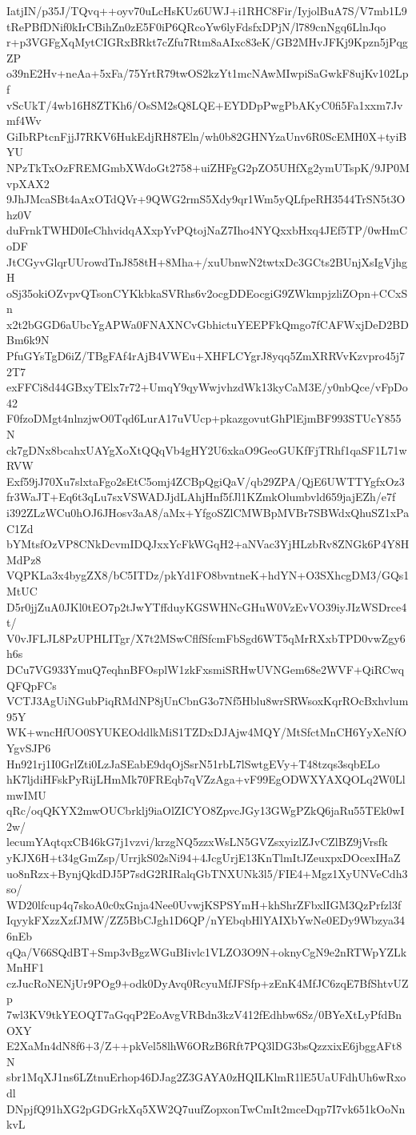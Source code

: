 IatjIN/p35J/TQvq++oyv70uLcHsKUz6UWJ+i1RHC8Fir/IyjolBuA7S/V7mb1L9
tRePBfDNif0kIrCBihZn0zE5F0iP6QRcoYw6lyFdsfxDPjN/l789cnNgq6LlnJqo
r+p3VGFgXqMytCIGRxBRkt7cZfu7Rtm8aAIxc83eK/GB2MHvJFKj9Kpzn5jPqgZP
o39nE2Hv+neAa+5xFa/75YrtR79twOS2kzYt1mcNAwMIwpiSaGwkF8ujKv102Lpf
vScUkT/4wb16H8ZTKh6/OsSM2sQ8LQE+EYDDpPwgPbAKyC0fi5Fa1xxm7Jvmf4Wv
GiIbRPtcnFjjJ7RKV6HukEdjRH87Eln/wh0b82GHNYzaUnv6R0ScEMH0X+tyiBYU
NPzTkTxOzFREMGmbXWdoGt2758+uiZHFgG2pZO5UHfXg2ymUTspK/9JP0MvpXAX2
9JhJMcaSBt4aAxOTdQVr+9QWG2rmS5Xdy9qr1Wm5yQLfpeRH3544TrSN5t3Ohz0V
duFrnkTWHD0IeChhvidqAXxpYvPQtojNaZ7Iho4NYQxxbHxq4JEf5TP/0wHmCoDF
JtCGyvGlqrUUrowdTnJ858tH+8Mha+/xuUbnwN2twtxDc3GCts2BUnjXsIgVjhgH
oSj35okiOZvpvQTsonCYKkbkaSVRhs6v2ocgDDEocgiG9ZWkmpjzliZOpn+CCxSn
x2t2bGGD6aUbcYgAPWa0FNAXNCvGbhictuYEEPFkQmgo7fCAFWxjDeD2BDBm6k9N
PfuGYsTgD6iZ/TBgFAf4rAjB4VWEu+XHFLCYgrJ8yqq5ZmXRRVvKzvpro45j72T7
exFFCi8d44GBxyTElx7r72+UmqY9qyWwjvhzdWk13kyCaM3E/y0nbQce/vFpDo42
F0fzoDMgt4nlnzjwO0Tqd6LurA17uVUcp+pkazgovutGhPlEjmBF993STUcY855N
ck7gDNx8bcahxUAYgXoXtQQqVb4gHY2U6xkaO9GeoGUKfFjTRhf1qaSF1L71wRVW
Exf59jJ70Xu7slxtaFgo2sEtC5omj4ZCBpQgiQaV/qb29ZPA/QjE6UWTTYgfxOz3
fr3WaJT+Eq6t3qLu7sxVSWADJjdLAhjHnf5fJl1KZmkOlumbvld659jajEZh/e7f
i392ZLzWCu0hOJ6JHosv3aA8/aMx+YfgoSZlCMWBpMVBr7SBWdxQhuSZ1xPaC1Zd
bYMtsfOzVP8CNkDcvmIDQJxxYcFkWGqH2+aNVac3YjHLzbRv8ZNGk6P4Y8HMdPz8
VQPKLa3x4bygZX8/bC5ITDz/pkYd1FO8bvntneK+hdYN+O3SXhcgDM3/GQs1MtUC
D5r0jjZuA0JKl0tEO7p2tJwYTffduyKGSWHNcGHuW0VzEvVO39iyJIzWSDrce4t/
V0vJFLJL8PzUPHLITgr/X7t2MSwCflfSfcmFbSgd6WT5qMrRXxbTPD0vwZgy6h6s
DCu7VG933YmuQ7eqhnBFOsplW1zkFxsmiSRHwUVNGem68e2WVF+QiRCwqQFQpFCs
VCTJ3AgUiNGubPiqRMdNP8jUnCbnG3o7Nf5Hblu8wrSRWsoxKqrROcBxhvlum95Y
WK+wncHfUO0SYUKEOddlkMiS1TZDxDJAjw4MQY/MtSfctMnCH6YyXeNfOYgvSJP6
Hn921rj1I0GrlZti0LzJaSEabE9dqOjSsrN51rbL7lSwtgEVy+T48tzqs3sqbELo
hK7ljdiHFskPyRijLHmMk70FREqb7qVZzAga+vF99EgODWXYAXQOLq2W0LlmwIMU
qRc/oqQKYX2mwOUCbrklj9iaOlZICYO8ZpvcJGy13GWgPZkQ6jaRu55TEk0wI2w/
lecumYAqtqxCB46kG7j1vzvi/krzgNQ5zzxWsLN5GVZsxyizlZJvCZlBZ9jVrsfk
yKJX6H+t34gGmZsp/UrrjkS02sNi94+4JcgUrjE13KnTlmItJZeuxpxDOcexIHaZ
uo8nRzx+BynjQkdDJ5P7sdG2RIRalqGbTNXUNk3l5/FIE4+Mgz1XyUNVeCdh3so/
WD20lfcup4q7skoA0c0xGnja4Nee0UvwjKSPSYmH+khShrZFbxlIGM3QzPrfzl3f
IqyykFXzzXzfJMW/ZZ5BbCJgh1D6QP/nYEbqbHlYAIXbYwNe0EDy9Wbzya346nEb
qQa/V66SQdBT+Smp3vBgzWGuBIivlc1VLZO3O9N+oknyCgN9e2nRTWpYZLkMnHF1
czJucRoNENjUr9POg9+odk0DyAvq0RcyuMfJFSfp+zEnK4MfJC6zqE7BfShtvUZp
7wl3KV9tkYEOQT7aGqqP2EoAvgVRBdn3kzV412fEdhbw6Sz/0BYeXtLyPfdBnOXY
E2XaMn4dN8f6+3/Z++pkVel58lhW6ORzB6Rft7PQ3lDG3bsQzzxixE6jbggAFt8N
sbr1MqXJ1ns6LZtnuErhop46DJag2Z3GAYA0zHQILKlmR1lE5UaUFdhUh6wRxodl
DNpjfQ91hXG2pGDGrkXq5XW2Q7uufZopxonTwCmIt2mceDqp7I7vk651kOoNnkvL
